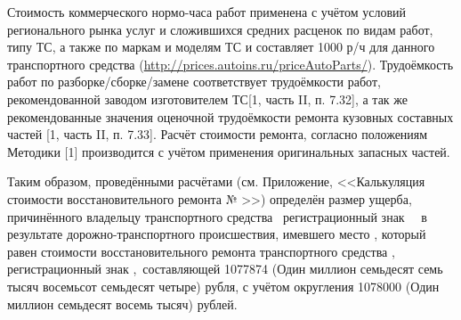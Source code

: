 
\medskip
\renewcommand\baselinestretch{1.2}\small\normalsize
Стоимость коммерческого нормо-часа работ применена  с учётом условий регионального рынка услуг и сложившихся средних расценок по видам работ, типу ТС, а также по маркам и моделям ТС  и   составляет 1000 р/ч для данного транспортного средства (\url{http://prices.autoins.ru/priceAutoParts/}). Трудоёмкость работ по разборке/сборке/замене  соответствует трудоёмкости работ, рекомендованной заводом изготовителем ТС[1, часть II, п. 7.32], а так же рекомендованные значения оценочной трудоёмкости ремонта кузовных составных частей [1, часть II, п. 7.33]. Расчёт стоимости ремонта, согласно положениям Методики [1] производится с учётом  применения оригинальных запасных частей. %
%
\par Таким образом,   проведёнными расчётами (см. Приложение, <<Калькуляция стоимости восстановительного ремонта № \NomerDoc>>) определён размер ущерба, причинённого владельцу  транспортного средства \tc\, регистрационный знак \, \, в результате дорожно-транспортного происшествия, имевшего место , который  равен стоимости восстановительного ремонта транспортного средства  , регистрационный  знак ,\, составляющей 1077874 (Один миллион семьдесят семь тысяч восемьсот семьдесят четыре) рубля,  с учётом округления 1078000 (Один миллион семьдесят восемь тысяч) рублей.




